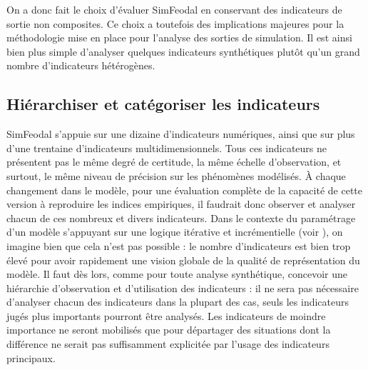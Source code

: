 On a donc fait le choix d'évaluer SimFeodal en conservant des indicateurs de sortie non composites.
Ce choix a toutefois des implications majeures pour la méthodologie mise en place pour l'analyse des sorties de simulation.
Il est ainsi bien plus simple d'analyser quelques indicateurs synthétiques plutôt qu'un grand nombre d'indicateurs hétérogènes.

\subsection{Hiérarchiser et catégoriser les indicateurs}

SimFeodal s'appuie sur une dizaine d'indicateurs numériques, ainsi que sur plus d'une trentaine d'indicateurs multidimensionnels.
Tous ces indicateurs ne présentent pas le même degré de certitude, la même échelle d'observation, et surtout, le même niveau de précision sur les phénomènes modélisés.
À chaque changement dans le modèle, pour une évaluation complète de la capacité de cette version à reproduire les indices empiriques, il faudrait donc observer et analyser chacun de ces nombreux et divers indicateurs.
Dans le contexte du paramétrage d'un modèle s'appuyant sur une logique itérative et incrémentielle (voir ), on imagine bien que cela n'est pas possible :
le nombre d'indicateurs est bien trop élevé pour avoir rapidement une vision globale de la qualité de représentation du modèle.
Il faut dès lors, comme pour toute analyse synthétique, concevoir une hiérarchie d'observation et d'utilisation des indicateurs :
il ne sera pas nécessaire d'analyser chacun des indicateurs dans la plupart des cas, seuls les indicateurs jugés plus importants pourront être analysés.
Les indicateurs de moindre importance ne seront mobilisés que pour départager des situations dont la différence ne serait pas suffisamment explicitée par l'usage des indicateurs principaux.

